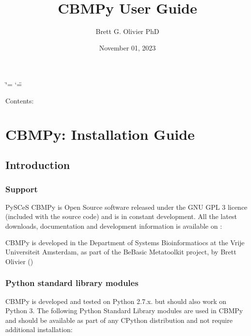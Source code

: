 \documentclass[letterpaper,10pt,english]{sphinxmanual}
\title{CBMPy User Guide}
\date{November 01, 2023}
\author{Brett G. Olivier PhD}
\begin{document}
\ifdefined\shorthandoff
  \ifnum\catcode`\=\string=\active\shorthandoff{=}\fi
  \ifnum\catcode`\"=\active{}\fi
\fi

\pagestyle{empty}
\sphinxmaketitle
\pagestyle{plain}
\sphinxtableofcontents
\pagestyle{normal}
\label{\detokenize{cbmpy::doc}}


\sphinxAtStartPar
Contents:

\sphinxstepscope


\chapter{CBMPy: Installation Guide}
\label{\detokenize{install_doc:cbmpy-installation-guide}}\label{\detokenize{install_doc::doc}}

\section{Introduction}
\label{\detokenize{install_doc:introduction}}

\subsection{Support}
\label{\detokenize{install_doc:support}}
\sphinxAtStartPar
PySCeS CBMPy is Open Source software released under the GNU GPL 3 licence (included with the source code)
and is in constant development. All the latest downloads, documentation and development information
is available on : 

\sphinxAtStartPar
CBMPy is developed in the Department of Systems Bioinformatiocs at the Vrije Universiteit Amsterdam, as part
of the BeBasic Metatoolkit project, by Brett Olivier ()


\subsection{Python standard library modules}
\label{\detokenize{install_doc:python-standard-library-modules}}
\sphinxAtStartPar
CBMPy is developed and tested on Python 2.7.x. but should also work on Python 3.
The following Python Standard Library modules are used in CBMPy and should be available as part of any CPython
distribution and not require additional installation:
\end{document}
